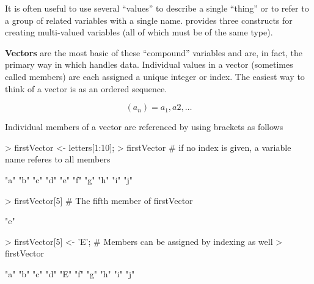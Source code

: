 \documentclass[10pt,letterpaper]{article}
\begin{document}
It is often useful to use several ``values'' to describe a single ``thing'' or to refer to a group of related variables with a single name.  \R provides three constructs for creating multi-valued variables (all of which must be of the same type).

\textbf{Vectors} are the most basic of these ``compound'' variables and are, in fact, the primary way in which \R handles data.  Individual values in a vector (sometimes called members) are each assigned a unique integer or index.  The easiest way to think of a vector is as an ordered sequence.

\begin{displaymath}
  (a_n) = a_1, a2, \ldots
\end{displaymath}

Individual members of a vector are referenced by using brackets as follows

\begin{Schunk}
\begin{Sinput}
> firstVector <- letters[1:10];
> firstVector   # if no index is given, a variable name referes to all members
\end{Sinput}
\begin{Soutput}
 [1] "a" "b" "c" "d" "e" "f" "g" "h" "i" "j"
\end{Soutput}
\begin{Sinput}
> firstVector[5]    # The fifth member of firstVector
\end{Sinput}
\begin{Soutput}
[1] "e"
\end{Soutput}
\begin{Sinput}
> firstVector[5] <- 'E';  # Members can be assigned by indexing as well
> firstVector
\end{Sinput}
\begin{Soutput}
 [1] "a" "b" "c" "d" "E" "f" "g" "h" "i" "j"
\end{Soutput}
\end{Schunk}
\end{document}

